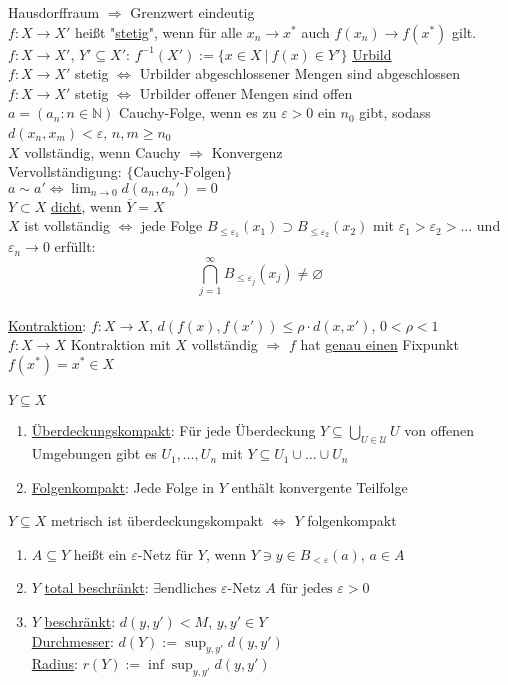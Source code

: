 \documentclass[a4paper]{article}
\newcommand{\ul}{\underline}
\let\epsilon\varepsilon
\begin{document}
Hausdorffraum $\Rightarrow$ Grenzwert eindeutig\\
$f:X\rightarrow X'$ heißt "\ul{stetig}", wenn für alle $x_n\rightarrow x^*$ auch $f(x_n)\rightarrow f(x^*)$ gilt.\\
$f:X\rightarrow X'$, $Y'\subseteq X'$: $f^{-1}(X'):=\{x\in X\ \vert\ f(x)\in Y'\}$ \ul{Urbild}\\
$f:X\rightarrow X'$ stetig $\Leftrightarrow$ Urbilder abgeschlossener Mengen sind abgeschlossen\\
$f:X\rightarrow X'$ stetig $\Leftrightarrow$ Urbilder offener Mengen sind offen\\
$a=(a_n:n\in\mathbb{N})$ Cauchy-Folge, wenn es zu $\epsilon>0$ ein $n_0$ gibt, sodass $d(x_n,x_m)<\epsilon$, $n,m\geq n_0$\\
$X$ vollständig, wenn Cauchy $\Rightarrow$ Konvergenz\\
Vervollständigung: $\{\text{Cauchy-Folgen}\}$\\
$a\sim a'\Leftrightarrow \lim_{n\rightarrow 0}d(a_n,a_n')=0$\\
$Y\subset X$ \ul{dicht}, wenn $\overline{Y}=X$\\
$X$ ist vollständig $\Leftrightarrow$ jede Folge $B_{\leq \epsilon_1}(x_1)\supset B_{\leq \epsilon_2}(x_2)$ mit $\epsilon_1>\epsilon_2>\dots$ und $\epsilon_n\rightarrow 0$ erfüllt:
$$\bigcap_{j=1}^\infty B_{\leq \epsilon_j}(x_j)\neq\varnothing$$\\
\ul{Kontraktion}: $f:X\rightarrow X$, $d(f(x),f(x'))\leq \rho\cdot d(x,x')$, $0<\rho<1$\\
$f:X\rightarrow X$ Kontraktion mit $X$ vollständig $\Rightarrow$ $f$ hat \ul{genau einen} Fixpunkt $f(x^*)=x^*\in X$\\\\
$Y\subseteq X$
\begin{enumerate}[1)]
	\item \ul{Überdeckungskompakt}: Für jede Überdeckung $Y\subseteq\bigcup_{U\in \mathcal{U}}U$ von offenen Umgebungen gibt es $U_1,\dots,U_n$ mit $Y\subseteq U_1\cup\dots\cup U_n$
	\item \ul{Folgenkompakt}: Jede Folge in $Y$ enthält konvergente Teilfolge
\end{enumerate}
$Y\subseteq X$ metrisch ist überdeckungskompakt $\Leftrightarrow$ $Y$ folgenkompakt\\
\begin{enumerate}[1)]
	\item $A\subseteq Y$ heißt ein $\epsilon$-Netz für $Y$, wenn $Y\ni y\in B_{<\epsilon}(a)$, $a\in A$
	\item $Y$ \ul{total beschränkt}: $\exists \text{endliches }\epsilon\text{-Netz }A\text{ für jedes }\epsilon>0$
	\item $Y$ \ul{beschränkt}: $d(y,y')<M$, $y,y'\in Y$\\
	\ul{Durchmesser}: $d(Y):=\sup_{y,y'}d(y,y')$\\
	\ul{Radius}: $r(Y):=\inf\sup_{y,y'}d(y,y')$
\end{enumerate}
\end{document}
